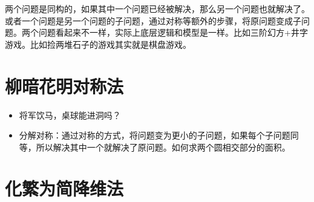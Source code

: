 \documentclass[12pt, letterpaper]{ctexrep}
\begin{document}
两个问题是同构的，如果其中一个问题已经被解决，那么另一个问题也就解决了。或者一个问题是另一个问题的子问题，通过对称等额外的步骤，将原问题变成子问题。两个问题看起来不一样，实际上底层逻辑和模型是一样。比如三阶幻方+井字游戏。比如捡两堆石子的游戏其实就是棋盘游戏。


\section{柳暗花明对称法}

\begin{itemize}
\item{ 将军饮马，桌球能进洞吗？ }
\item{ 分解对称：通过对称的方式，将问题变为更小的子问题，如果每个子问题同等，所以解决其中一个就解决了原问题。如何求两个圆相交部分的面积。 }
\end{itemize}



\section{化繁为简降维法}
\end{document}
